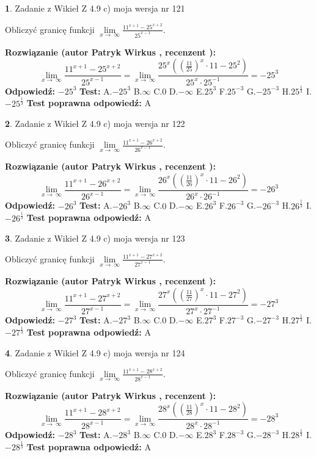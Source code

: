 \documentclass[12pt, a4paper]{article}
\theoremstyle{definition} %
\newtheorem{zad}{}
\newcommand{\zadStart}[1]{\begin{zad}#1\newline}
\newcommand{\zadStop}{\end{zad}}
\newcommand{\rozwStart}[2]{\noindent \textbf{Rozwiązanie (autor #1 , recenzent #2): }\newline}
\newcommand{\rozwStop}{\newline}
\newcommand{\odpStart}{\noindent \textbf{Odpowiedź:}\newline}
\newcommand{\odpStop}{\newline}
\newcommand{\testStart}{\noindent \textbf{Test:}\newline}
\newcommand{\testStop}{\newline}
\newcommand{\kluczStart}{\noindent \textbf{Test poprawna odpowiedź:}\newline}
\newcommand{\kluczStop}{\newline}
\begin{document}
\zadStart{Zadanie z Wikieł Z 4.9 c) moja wersja nr 121}


Obliczyć granicę funkcji  $\lim\limits_{x\to\ \infty}\frac{11^{x+1}-25^{x+2}}{25^{x-1}}$.
\zadStop
\rozwStart{Patryk Wirkus}{}
$$\lim\limits_{x\to\ \infty}\frac{11^{x+1}-25^{x+2}}{25^{x-1}}=\lim\limits_{x\to\ \infty}\frac{25^{x}((\frac{11}{25})^{x}\cdot 11 -25^{2})}{25^{x}\cdot 25^{-1}} = -25^{3}$$
\rozwStop
\odpStart
$-25^{3}$
\odpStop
\testStart
A.$-25^{3}$ B.$\infty$ C.$0$ D.$-\infty$ E.$25^{3}$
F.$25^{-3}$ G.$-25^{-3}$
H.$25^{\frac{1}{3}}$
I.$-25^{\frac{1}{3}}$
\testStop
\kluczStart
A
\kluczStop



\zadStart{Zadanie z Wikieł Z 4.9 c) moja wersja nr 122}


Obliczyć granicę funkcji  $\lim\limits_{x\to\ \infty}\frac{11^{x+1}-26^{x+2}}{26^{x-1}}$.
\zadStop
\rozwStart{Patryk Wirkus}{}
$$\lim\limits_{x\to\ \infty}\frac{11^{x+1}-26^{x+2}}{26^{x-1}}=\lim\limits_{x\to\ \infty}\frac{26^{x}((\frac{11}{26})^{x}\cdot 11 -26^{2})}{26^{x}\cdot 26^{-1}} = -26^{3}$$
\rozwStop
\odpStart
$-26^{3}$
\odpStop
\testStart
A.$-26^{3}$ B.$\infty$ C.$0$ D.$-\infty$ E.$26^{3}$
F.$26^{-3}$ G.$-26^{-3}$
H.$26^{\frac{1}{3}}$
I.$-26^{\frac{1}{3}}$
\testStop
\kluczStart
A
\kluczStop



\zadStart{Zadanie z Wikieł Z 4.9 c) moja wersja nr 123}


Obliczyć granicę funkcji  $\lim\limits_{x\to\ \infty}\frac{11^{x+1}-27^{x+2}}{27^{x-1}}$.
\zadStop
\rozwStart{Patryk Wirkus}{}
$$\lim\limits_{x\to\ \infty}\frac{11^{x+1}-27^{x+2}}{27^{x-1}}=\lim\limits_{x\to\ \infty}\frac{27^{x}((\frac{11}{27})^{x}\cdot 11 -27^{2})}{27^{x}\cdot 27^{-1}} = -27^{3}$$
\rozwStop
\odpStart
$-27^{3}$
\odpStop
\testStart
A.$-27^{3}$ B.$\infty$ C.$0$ D.$-\infty$ E.$27^{3}$
F.$27^{-3}$ G.$-27^{-3}$
H.$27^{\frac{1}{3}}$
I.$-27^{\frac{1}{3}}$
\testStop
\kluczStart
A
\kluczStop



\zadStart{Zadanie z Wikieł Z 4.9 c) moja wersja nr 124}


Obliczyć granicę funkcji  $\lim\limits_{x\to\ \infty}\frac{11^{x+1}-28^{x+2}}{28^{x-1}}$.
\zadStop
\rozwStart{Patryk Wirkus}{}
$$\lim\limits_{x\to\ \infty}\frac{11^{x+1}-28^{x+2}}{28^{x-1}}=\lim\limits_{x\to\ \infty}\frac{28^{x}((\frac{11}{28})^{x}\cdot 11 -28^{2})}{28^{x}\cdot 28^{-1}} = -28^{3}$$
\rozwStop
\odpStart
$-28^{3}$
\odpStop
\testStart
A.$-28^{3}$ B.$\infty$ C.$0$ D.$-\infty$ E.$28^{3}$
F.$28^{-3}$ G.$-28^{-3}$
H.$28^{\frac{1}{3}}$
I.$-28^{\frac{1}{3}}$
\testStop
\kluczStart
A
\kluczStop
\end{document}
